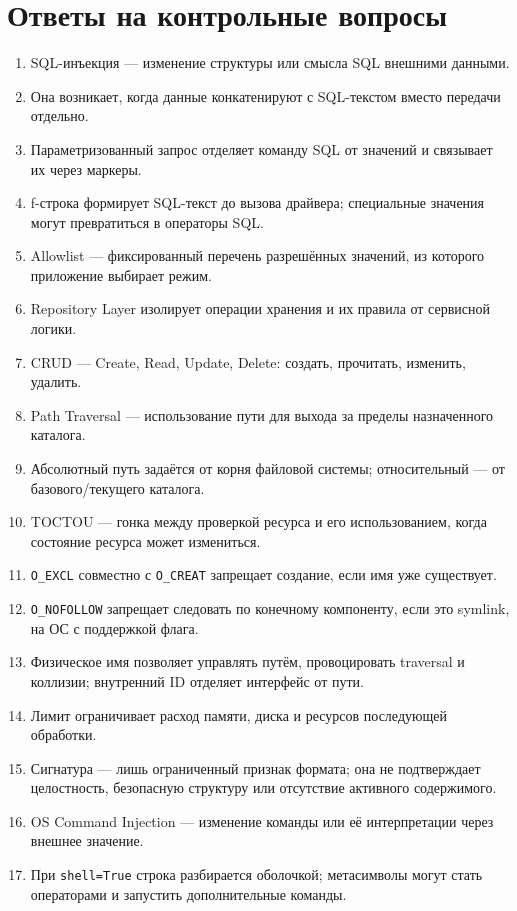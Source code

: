 \documentclass[12pt,a4paper]{article}
\begin{document}
\section{Ответы на контрольные вопросы}
\begin{enumerate}
\item SQL-инъекция — изменение структуры или смысла SQL внешними данными.
\item Она возникает, когда данные конкатенируют с SQL-текстом вместо передачи отдельно.
\item Параметризованный запрос отделяет команду SQL от значений и связывает их через маркеры.
\item f-строка формирует SQL-текст до вызова драйвера; специальные значения могут превратиться в операторы SQL.
\item Allowlist — фиксированный перечень разрешённых значений, из которого приложение выбирает режим.
\item Repository Layer изолирует операции хранения и их правила от сервисной логики.
\item CRUD — Create, Read, Update, Delete: создать, прочитать, изменить, удалить.
\item Path Traversal — использование пути для выхода за пределы назначенного каталога.
\item Абсолютный путь задаётся от корня файловой системы; относительный — от базового/текущего каталога.
\item TOCTOU — гонка между проверкой ресурса и его использованием, когда состояние ресурса может измениться.
\item \texttt{O\_EXCL} совместно с \texttt{O\_CREAT} запрещает создание, если имя уже существует.
\item \texttt{O\_NOFOLLOW} запрещает следовать по конечному компоненту, если это symlink, на ОС с поддержкой флага.
\item Физическое имя позволяет управлять путём, провоцировать traversal и коллизии; внутренний ID отделяет интерфейс от пути.
\item Лимит ограничивает расход памяти, диска и ресурсов последующей обработки.
\item Сигнатура — лишь ограниченный признак формата; она не подтверждает целостность, безопасную структуру или отсутствие активного содержимого.
\item OS Command Injection — изменение команды или её интерпретации через внешнее значение.
\item При \texttt{shell=True} строка разбирается оболочкой; метасимволы могут стать операторами и запустить дополнительные команды.

\end{enumerate}
\end{document}
